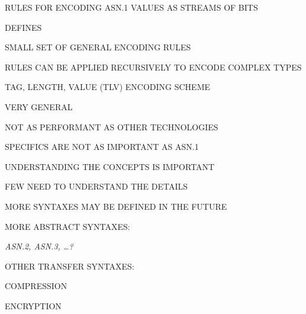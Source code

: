 %
%


\begin{bwslide}

\begin{nrtc}
\item	RULES FOR ENCODING ASN.1 VALUES AS STREAMS OF BITS
\item	DEFINES
	\begin{nrtc}
	\item	SMALL SET OF GENERAL ENCODING RULES
	\item	RULES CAN BE APPLIED RECURSIVELY TO ENCODE COMPLEX TYPES
	\end{nrtc}
\item	TAG, LENGTH, VALUE (TLV) ENCODING SCHEME
\item	VERY GENERAL
\item	NOT AS PERFORMANT AS OTHER TECHNOLOGIES
\end{nrtc}
\end{bwslide}


\begin{bwslide}

\begin{nrtc}
\item	SPECIFICS ARE NOT AS IMPORTANT AS ASN.1
\item	UNDERSTANDING THE CONCEPTS IS IMPORTANT
\item	FEW NEED TO UNDERSTAND THE DETAILS
\end{nrtc}
\end{bwslide}


\begin{bwslide}

\begin{nrtc}
\item	MORE SYNTAXES MAY BE DEFINED IN THE FUTURE
\item	MORE ABSTRACT SYNTAXES:
	\begin{nrtc}
	\item	{\em ASN.2, ASN.3, \ldots ?}
	\end{nrtc}
\item	OTHER TRANSFER SYNTAXES:
	\begin{nrtc}
	\item	COMPRESSION
	\item	ENCRYPTION
	\end{nrtc}
\end{nrtc}
\end{bwslide}


